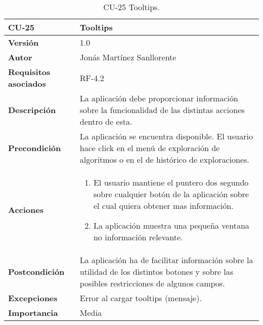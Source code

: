 \begin{table}[p]
	\centering
	\begin{tabularx}{\linewidth}{ p{} p{} }
		\toprule
		\textbf{CU-25}    & \textbf{Tooltips}\\
		\toprule
		\textbf{Versión}              & 1.0    \\
		\textbf{Autor}                & Jonás Martínez Sanllorente \\
		\textbf{Requisitos asociados} & RF-4.2 \\
		\textbf{Descripción}          & La aplicación debe proporcionar información sobre la funcionalidad de las distintas acciones dentro de esta. \\
		\textbf{Precondición}         & La aplicación se encuentra disponible.\newline
                                        El usuario hace click en el menú de exploración de algoritmos o en el de histórico de exploraciones. \\
		\textbf{Acciones}             &
		\begin{enumerate}
			\def\labelenumi{\arabic{enumi}.}
			\tightlist
			\item El usuario mantiene el puntero dos segundo sobre cualquier botón de la aplicación sobre el cual quiera obtener mas información.
            \item La aplicación muestra una pequeña ventana no información relevante.
		\end{enumerate}\\
		\textbf{Postcondición}        & La aplicación ha de facilitar información sobre la utilidad de los distintos botones y sobre las posibles restricciones de algunos campos. \\
		\textbf{Excepciones}          & Error al cargar tooltips (mensaje). \\
		\textbf{Importancia}          & Media \\
		\bottomrule
	\end{tabularx}
	\caption{CU-25 Tooltips.}
\end{table}
